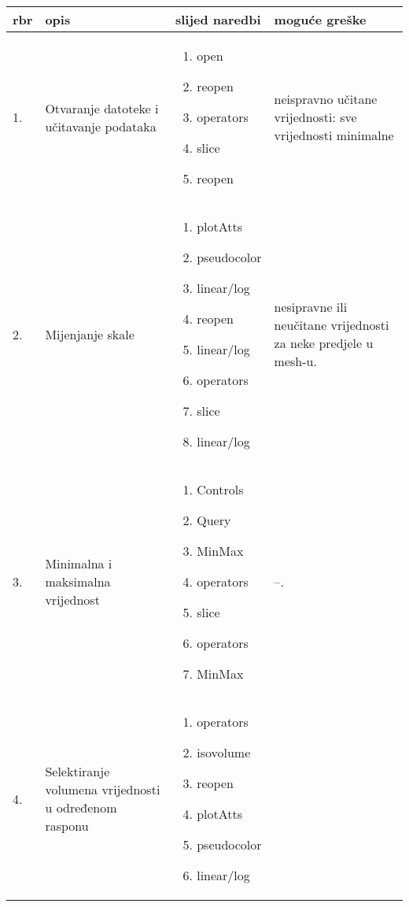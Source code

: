\documentclass[times, utf8, zavrsni]{fer}
\begin{document}
	\begin{longtable}{|l|p{80pt}|p{100pt}|p{120pt}|}
\hline
rbr & opis & slijed naredbi & moguće greške\\
\hline
\endhead %
1. & Otvaranje datoteke i učitavanje podataka &
\begin{enumerate}
    \item open
    \item reopen
    \item operators
    \item slice
    \item reopen
\end{enumerate}
& neispravno učitane vrijednosti: sve vrijednosti minimalne\\
\hline
2. & Mijenjanje skale & \begin{enumerate}
    \item plotAtts
    \item pseudocolor
    \item linear/log
    \item reopen
    \item linear/log
    \item operators
    \item slice
    \item linear/log
\end{enumerate}
& nesipravne ili neučitane vrijednosti za neke predjele u mesh-u.\\
\hline
3. & Minimalna i maksimalna vrijednost & \begin{enumerate}
    \item Controls
    \item Query
    \item MinMax
    \item operators
    \item slice
    \item operators
    \item MinMax
\end{enumerate}
& --.\\
\hline
4. & Selektiranje volumena vrijednosti u određenom rasponu & \begin{enumerate}
    \item operators
    \item isovolume
    \item reopen
    \item plotAtts
    \item pseudocolor
    \item linear/log

\end{enumerate}
\end{longtable}
\end{document}
